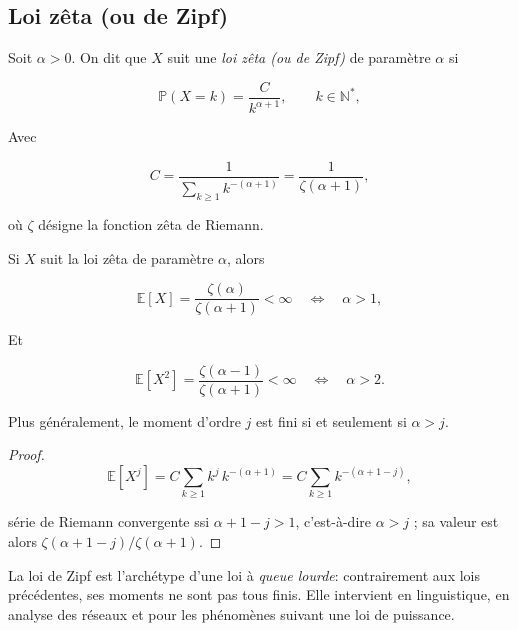 \newpage

\subsection{Loi zêta (ou de Zipf)}

\medskip

\begin{mdframed}
\begin{definition}
Soit $\alpha>0$. On dit que $X$ suit une \textit{loi zêta (ou de Zipf)} de
paramètre $\alpha$ si

$$
  \mathbb{P}(X=k)=\frac{C}{k^{\alpha+1}},\qquad k\in\mathbb{N}^*,
$$

Avec 

$$
C=\frac{1}{\displaystyle\sum_{k\ge1}k^{-(\alpha+1)}}
  =\frac{1}{\zeta(\alpha+1)},
$$

où $\zeta$ désigne la fonction zêta de Riemann.
\end{definition}
\end{mdframed}

\medskip

\begin{mdframed}
\begin{proposition}
Si $X$ suit la loi zêta de paramètre $\alpha$, alors

$$
  \mathbb{E}[X]=\frac{\zeta(\alpha)}{\zeta(\alpha+1)}<\infty
  \quad\Longleftrightarrow\quad \alpha>1,
$$

Et

$$
\mathbb{E}[X^2]=\frac{\zeta(\alpha-1)}{\zeta(\alpha+1)}<\infty
  \quad\Longleftrightarrow\quad \alpha>2.
$$

Plus généralement, le moment d'ordre $j$ est fini si et seulement si $\alpha>j$.
\end{proposition}
\end{mdframed}

\begin{proof}
$$
\mathbb{E}[X^j]=C\sum_{k\ge1}k^{j}\,k^{-(\alpha+1)}=C\sum_{k\ge1}k^{-(\alpha+1-j)},
$$

série de Riemann convergente ssi $\alpha+1-j>1$, c'est-à-dire $\alpha>j$ ; sa valeur est alors $\zeta(\alpha+1-j)/\zeta(\alpha+1)$.
\end{proof}

\begin{remarque}
La loi de Zipf est l'archétype d'une loi à \emph{queue lourde}: contrairement aux lois précédentes, ses moments ne sont pas tous finis. Elle intervient en linguistique, en analyse des réseaux et pour les phénomènes suivant une loi de puissance.
\end{remarque}


